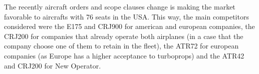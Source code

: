 The recently aircraft orders and scope clauses change is making the market favorable to aircrafts with 76 seats in the USA. This way, the main competitors considered were the E175 and CRJ900 for american and european companies, the CRJ200 for companies that already operate both airplanes (in a case that the company choose one of them to retain in the fleet), the ATR72 for european companies (as Europe has a higher acceptance to turboprops) and the ATR42 and CRJ200 for New Operator. 